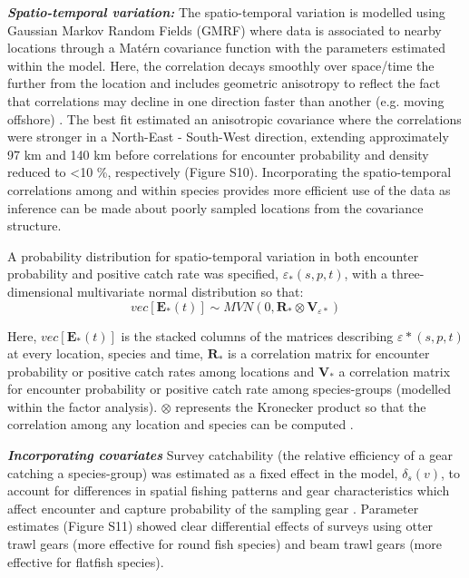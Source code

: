 \documentclass{nature}
\begin{document}
\begin{linenumbers}
\textbf{\textit{Spatio-temporal variation:}} The spatio-temporal variation is
modelled using Gaussian Markov Random Fields (GMRF) where data is associated to
nearby locations through a Matérn covariance function with the parameters
estimated within the model. Here, the correlation decays smoothly over
space/time the further from the location and includes geometric anisotropy to
reflect the fact that correlations may decline in one direction faster than
another (e.g. moving offshore) \cite{Thorson2013}.  The best fit estimated an
anisotropic covariance where the correlations were stronger in a North-East -
South-West direction, extending approximately 97 km and 140 km before
correlations for encounter probability and density reduced to \textless 10 \%,
respectively (Figure S10).  Incorporating the spatio-temporal correlations
among and within species provides more efficient use of the data as inference
can be made about poorly sampled locations from the covariance structure.

A probability distribution for spatio-temporal variation in both encounter
probability and positive catch rate was specified, $\varepsilon_{*}(s,p,t)$,
with a three-dimensional multivariate normal distribution so that:
	\begin{equation}
		vec[\mathbf{E}_{*}(t)] \sim MVN(0,\mathbf{R}_{*} \otimes
		\mathbf{V}_{{\varepsilon}{*}})
	\end{equation}

Here, $vec[\mathbf{E}_{*}(t)]$ is the stacked columns of the matrices
describing $\varepsilon{*}(s,p,t)$ at every location, species and time,
$\mathbf{R}_{*}$ is a correlation matrix for encounter probability or positive
catch rates among locations and $\mathbf{V}_{*}$ a correlation matrix for
encounter probability or positive catch rate among species-groups (modelled
within the factor analysis). $\otimes$ represents the Kronecker product so that
the correlation among any location and species can be computed
\cite{Thorson2017}.
		
\textbf{\textit{Incorporating covariates}} Survey catchability (the relative
efficiency of a gear catching a species-group) was estimated as a fixed effect
in the model, $\delta_{s}(v)$, to account for differences in spatial fishing
patterns and gear characteristics which affect encounter and capture
probability of the sampling gear \cite{Thorson2014}. Parameter estimates
(Figure S11) showed clear differential effects of surveys using otter trawl
gears (more effective for round fish species) and beam trawl gears (more
effective for flatfish species).


\end{linenumbers}
\end{document}
